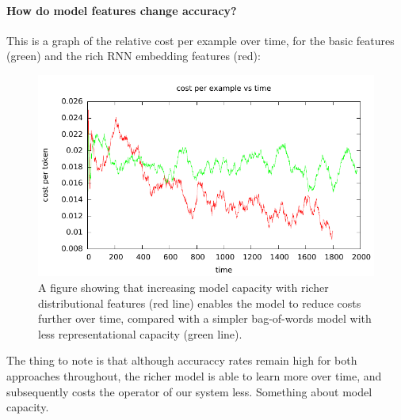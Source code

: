 \paragraph{How do model features change accuracy?}

This is a graph of the relative cost per example over time, for the basic features (green) and the rich RNN embedding features (red):

\begin{figure}[t]
  \begin{centering}
  \includegraphics[width=1.0\textwidth]{figures/sentiment_cost_per_token_vs_time/cost_per_token_vs_time.pdf}
  \end{centering}
  \caption{A figure showing that increasing model capacity with richer distributional features (red line) enables the model to reduce costs further over time, compared with a simpler bag-of-words model with less representational capacity (green line).}
\label{fig:sentiment-tradeoff}
\end{figure}

The thing to note is that although accuraccy rates remain high for both approaches throughout, the richer model is able to learn more over time, and subsequently costs the operator of our system less.
Something about model capacity.
